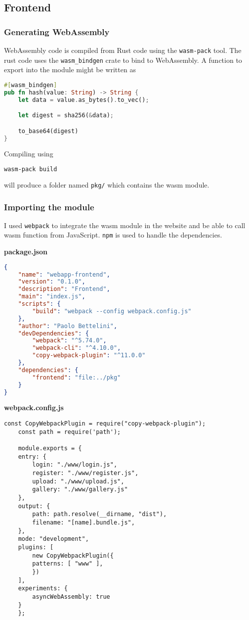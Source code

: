 \documentclass[../documentation.tex]{subfiles}
\begin{document}
\subsection{Frontend}

\subsubsection{Generating WebAssembly}

WebAssembly code is compiled from Rust code using the \texttt{wasm-pack} tool.
The rust code uses the \texttt{wasm\_bindgen} crate to bind to WebAssembly.
A function to export into the module might be written as

\begin{lstlisting}[language=Rust, style=boxed, numbers=none]
#[wasm_bindgen]
pub fn hash(value: String) -> String {
    let data = value.as_bytes().to_vec();

    let digest = sha256(&data);

    to_base64(digest)
}
\end{lstlisting}

Compiling using
\begin{lstlisting}[language=bash]
    wasm-pack build
\end{lstlisting}
will produce a folder named \texttt{pkg/} which contains the wasm module.

\subsubsection{Importing the module}

I used \texttt{webpack} to integrate the wasm module in the website
and be able to call wasm function from JavaScript.
\texttt{npm} is used to handle the dependencies.

\textbf{package.json}
\begin{lstlisting}[language=json]
{
    "name": "webapp-frontend",
    "version": "0.1.0",
    "description": "Frontend",
    "main": "index.js",
    "scripts": {
        "build": "webpack --config webpack.config.js"
    },
    "author": "Paolo Bettelini",
    "devDependencies": {
        "webpack": "^5.74.0",
        "webpack-cli": "^4.10.0",
        "copy-webpack-plugin": "^11.0.0"
    },
    "dependencies": {
        "frontend": "file:../pkg"
    }
}
\end{lstlisting}

\textbf{webpack.config.js}
\begin{lstlisting}[style=js]
    const CopyWebpackPlugin = require("copy-webpack-plugin");
    const path = require('path');

    module.exports = {
    entry: {
        login: "./www/login.js",
        register: "./www/register.js",
        upload: "./www/upload.js",
        gallery: "./www/gallery.js"
    },
    output: {
        path: path.resolve(__dirname, "dist"),
        filename: "[name].bundle.js",
    },
    mode: "development",
    plugins: [
        new CopyWebpackPlugin({
        patterns: [ "www" ],
        })
    ],
    experiments: {
        asyncWebAssembly: true
    }
    };
\end{lstlisting}
\end{document}
